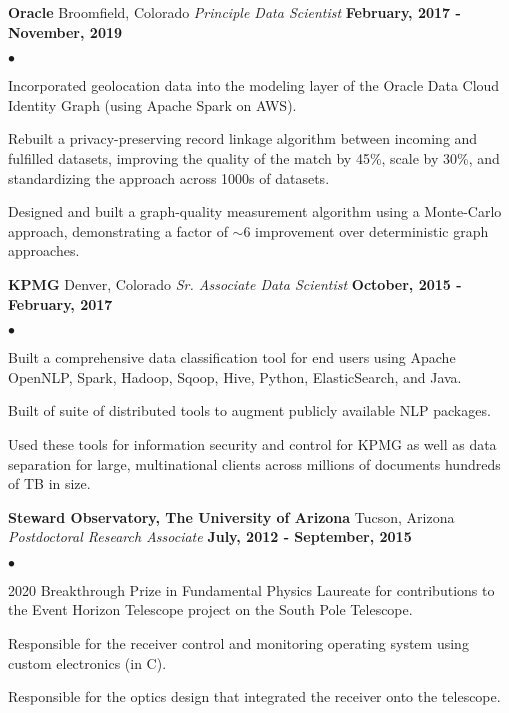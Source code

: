 \documentclass[margin,line, 11pt]{res}
\newenvironment{list2}{
  \begin{list}{$\bullet$}{%
      \setlength{\itemsep}{0in}
      \setlength{\parsep}{0in} \setlength{\parskip}{0in}
      \setlength{\topsep}{0in} \setlength{\partopsep}{0in}
      \setlength{\leftmargin}{0.2in}}}{\end{list}}
\begin{document}
\begin{resume}
\textbf{Oracle} \hfill Broomfield, Colorado\newline
\textit{Principle Data Scientist} \hfill \textbf{February, 2017 - November, 2019}\newline
    \begin{list2}
    	\vspace*{-5mm}
      \item Incorporated geolocation data into the modeling layer of the Oracle Data Cloud Identity Graph (using Apache Spark on AWS).
    	\item Rebuilt a privacy-preserving record linkage algorithm between incoming and fulfilled datasets, improving the quality of the match by 45\%, scale by 30\%, and standardizing the approach across 1000s of datasets.
    	\item Designed and built a graph-quality measurement algorithm using a Monte-Carlo approach, demonstrating a factor of $\sim 6$ improvement over deterministic graph approaches.
    \end{list2}
\vspace*{-2mm}

\textbf{KPMG} \hfill Denver, Colorado\newline
\textit{Sr. Associate Data Scientist} \hfill \textbf{October, 2015 - February, 2017}\newline
    \begin{list2}
    	\vspace*{-5mm}
      \item Built a comprehensive data classification tool for end users using Apache OpenNLP, Spark, Hadoop, Sqoop, Hive, Python, ElasticSearch, and Java.
      \item Built of suite of distributed tools to augment publicly available NLP packages.
      \item Used these tools for information security and control for KPMG as well as data separation for large, multinational clients across millions of documents hundreds of TB in size.
    \end{list2}
\vspace*{-2mm}

\textbf{Steward Observatory, The University of Arizona} \hfill Tucson, Arizona\newline
\textit{Postdoctoral Research Associate} \hfill \textbf{July, 2012 - September, 2015}\newline
    \begin{list2}
    	\vspace*{-5mm}
      \item 2020 Breakthrough Prize in Fundamental Physics Laureate for contributions to the Event Horizon Telescope project on the South Pole Telescope.
      \item Responsible for the receiver control and monitoring operating system using custom electronics (in C).
      \item Responsible for the optics design that integrated the receiver onto the telescope.
    \end{list2}
\vspace*{-2mm}


\end{resume}
\end{document}
